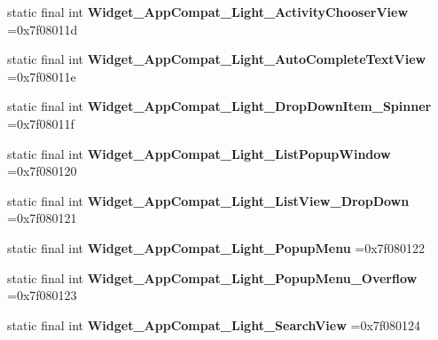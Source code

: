 \begin{DoxyCompactItemize}
\item 
\hypertarget{classcheck_1_1test_1_1_r_1_1style_a0e04477a3d47a6985afbe09802841439}{}static final int {\bfseries Widget\+\_\+\+App\+Compat\+\_\+\+Light\+\_\+\+Activity\+Chooser\+View} =0x7f08011d\label{classcheck_1_1test_1_1_r_1_1style_a0e04477a3d47a6985afbe09802841439}

\item 
\hypertarget{classcheck_1_1test_1_1_r_1_1style_abfbbe166564f74e47bbb9417a685863f}{}static final int {\bfseries Widget\+\_\+\+App\+Compat\+\_\+\+Light\+\_\+\+Auto\+Complete\+Text\+View} =0x7f08011e\label{classcheck_1_1test_1_1_r_1_1style_abfbbe166564f74e47bbb9417a685863f}

\item 
\hypertarget{classcheck_1_1test_1_1_r_1_1style_aba6647ef494cbdf7efeac984cb482134}{}static final int {\bfseries Widget\+\_\+\+App\+Compat\+\_\+\+Light\+\_\+\+Drop\+Down\+Item\+\_\+\+Spinner} =0x7f08011f\label{classcheck_1_1test_1_1_r_1_1style_aba6647ef494cbdf7efeac984cb482134}

\item 
\hypertarget{classcheck_1_1test_1_1_r_1_1style_afbc560a488d6f8d87aa98d70b60dd9d9}{}static final int {\bfseries Widget\+\_\+\+App\+Compat\+\_\+\+Light\+\_\+\+List\+Popup\+Window} =0x7f080120\label{classcheck_1_1test_1_1_r_1_1style_afbc560a488d6f8d87aa98d70b60dd9d9}

\item 
\hypertarget{classcheck_1_1test_1_1_r_1_1style_a255afcf1bdb1e74e1969da9638a3d770}{}static final int {\bfseries Widget\+\_\+\+App\+Compat\+\_\+\+Light\+\_\+\+List\+View\+\_\+\+Drop\+Down} =0x7f080121\label{classcheck_1_1test_1_1_r_1_1style_a255afcf1bdb1e74e1969da9638a3d770}

\item 
\hypertarget{classcheck_1_1test_1_1_r_1_1style_a6a72d3f547207f57c14992f454cb5d38}{}static final int {\bfseries Widget\+\_\+\+App\+Compat\+\_\+\+Light\+\_\+\+Popup\+Menu} =0x7f080122\label{classcheck_1_1test_1_1_r_1_1style_a6a72d3f547207f57c14992f454cb5d38}

\item 
\hypertarget{classcheck_1_1test_1_1_r_1_1style_af5f5e6b5f1ac1c3237daa6f2f40db0ee}{}static final int {\bfseries Widget\+\_\+\+App\+Compat\+\_\+\+Light\+\_\+\+Popup\+Menu\+\_\+\+Overflow} =0x7f080123\label{classcheck_1_1test_1_1_r_1_1style_af5f5e6b5f1ac1c3237daa6f2f40db0ee}

\item 
\hypertarget{classcheck_1_1test_1_1_r_1_1style_ac8f2dc312ce07582acd8ea0e03ef6dd6}{}static final int {\bfseries Widget\+\_\+\+App\+Compat\+\_\+\+Light\+\_\+\+Search\+View} =0x7f080124\label{classcheck_1_1test_1_1_r_1_1style_ac8f2dc312ce07582acd8ea0e03ef6dd6}


\end{DoxyCompactItemize}
